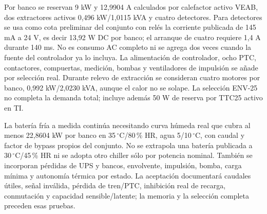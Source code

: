 Por banco se reservan 9 kW y 12,9904 A calculados por calefactor activo VEAB, dos extractores activos 0,496 kW/1,0115 kVA y cuatro detectores. Para detectores se usa como cota preliminar del conjunto con relés la corriente publicada de 145 mA a 24 V, es decir 13,92 W DC por banco; el arranque de cuatro requiere 1,4 A durante 140 ms. No es consumo AC completo ni se agrega dos veces cuando la fuente del controlador ya lo incluya. La alimentación de controlador, ocho PTC, contactores, compuertas, medición, bombas y ventiladores de impulsión se añade por selección real. Durante relevo de extracción se consideran cuatro motores por banco, 0,992 kW/2,0230 kVA, aunque el calor no se solape. La selección ENV-25 no completa la demanda total; incluye además 50 W de reserva por TTC25 activo en TI.

La batería fría a medida continúa necesitando curva húmeda real que cubra al menos 22,8604 kW por banco en 35\,$^{\circ}$C/80\,\% HR, agua 5/10\,$^{\circ}$C, con caudal y factor de bypass propios del conjunto. No se extrapola una batería publicada a 30\,$^{\circ}$C/45\,\% HR ni se adopta otro chiller sólo por potencia nominal. También se incorporan pérdidas de UPS y bancos, envolvente, impulsión, bomba, carga mínima y autonomía térmica por estado. La aceptación documentará caudales útiles, señal inválida, pérdida de tren/PTC, inhibición real de recarga, conmutación y capacidad sensible/latente; la memoria y la selección completa preceden esas pruebas.
